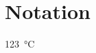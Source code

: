 \documentclass[12pt,ngerman,DIV=10,
BCOR=1cm,bibliography=totoc,listof=totoc]{scrbook}
\begin{document}
\frontmatter
\maketitle


\tableofcontents

\listoffigures 

\listoftables

\chapter*{Notation}

\mainmatter




\SI{123}{\celsius}



\citep{knuth:1984}

\clearpage

\citet{knuth:1984}




\backmatter
\printbibliography
\end{document}
